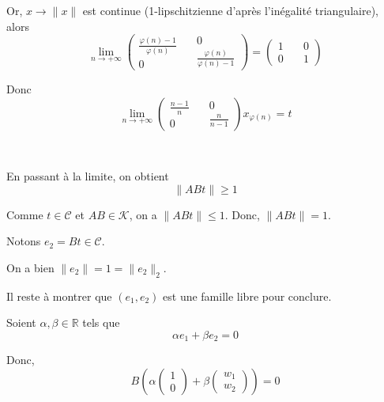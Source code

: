 Or, $x \rightarrow \| x \|$ est continue (1-lipschitzienne d'apr{\`e}s
l'in{\'e}galit{\'e} triangulaire), alors
\[ \underset{n \rightarrow + \infty}{\lim} \left( \begin{array}{c}
     \frac{\varphi (n) - 1}{\varphi (n)}\\
     0
   \end{array} \quad \begin{array}{c}
     0\\
     \frac{\varphi (n)}{\varphi (n) - 1}
   \end{array} \right) = \left( \begin{array}{c}
     1\\
     0
   \end{array} \quad \begin{array}{c}
     0\\
     1
   \end{array} \right) \]


Donc
\[ \underset{n \rightarrow + \infty}{\lim} \left( \begin{array}{c}
     \frac{n - 1}{n}\\
     0
   \end{array} \quad \begin{array}{c}
     0\\
     \frac{n}{n - 1}
   \end{array} \right) x_{\varphi (n)} = t \]


\

En passant {\`a} la limite, on obtient
\[ \| A B t \| \geqslant 1 \]


Comme $t \in \mathcal{C}$ et $A B \in \mathcal{K}$, on a $\| A B t \|
\leqslant 1$. Donc, $\| A B t \| = 1$.

Notons $e_2 = B t \in \mathcal{C}$.

On a bien $\| e_2 \| = 1 = \| e_2 \|_2$.

Il reste {\`a} montrer que $(e_1, e_2)$ est une famille libre pour conclure.

Soient $\alpha, \beta \in \mathbb{R}$ tels que
\[ \alpha e_1 + \beta e_2 = 0 \]


Donc,
\[ B \left( \alpha \left( \begin{array}{c}
     1\\
     0
   \end{array} \right) + \beta \left( \begin{array}{c}
     w_1\\
     w_2
   \end{array} \right) \right) = 0 \]


